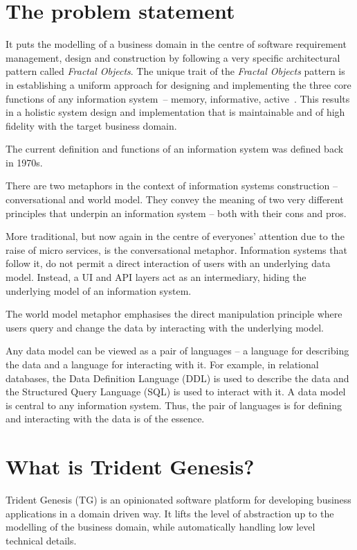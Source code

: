 \documentclass[a4paper,12pt,oneside,openright,final]{memoir} %
\begin{document}
\section*{The problem statement}

	It puts the modelling of a business domain in the centre of software requirement management, design and construction by following a very specific architectural pattern called \emph{Fractal Objects}.
	The unique trait of the \emph{Fractal Objects} pattern is in establishing a uniform approach for designing and implementing the three core functions of any information system~-- memory, informative, active~\cite{oli2007}.
	This results in a holistic system design and implementation that is maintainable and of high fidelity with the target business domain.

	The current definition and functions of an information system was defined back in 1970s.
	

	
	There are two metaphors in the context of information systems construction -- conversational and world model.
	They convey the meaning of two very different principles that underpin an information system -- both with their cons and pros.
	
	More traditional, but now again in the centre of everyones' attention due to the raise of micro services, is the conversational metaphor.
	Information systems that follow it, do not permit a direct interaction of users with an underlying data model.
	Instead, a UI and API layers act as an intermediary, hiding the underlying model of an information system.
	
	The world model metaphor emphasises the direct manipulation principle where users query and change the data by interacting with the underlying model.
	
	Any data model can be viewed as a pair of languages -- a language for describing the data and a language for interacting with it.
	For example, in relational databases, the Data Definition Language (DDL) is used to describe the data and the Structured Query Language (SQL) is used to interact with it.
	A data model is central to any information system.
	Thus, the pair of languages is for defining and interacting with the data is of the essence.



\section*{What is Trident Genesis?}
  Trident Genesis (TG) is an opinionated software platform for developing business applications in a domain driven way.
  It lifts the level of abstraction up to the modelling of the business domain, while automatically handling low level technical details.
  
\end{document}
